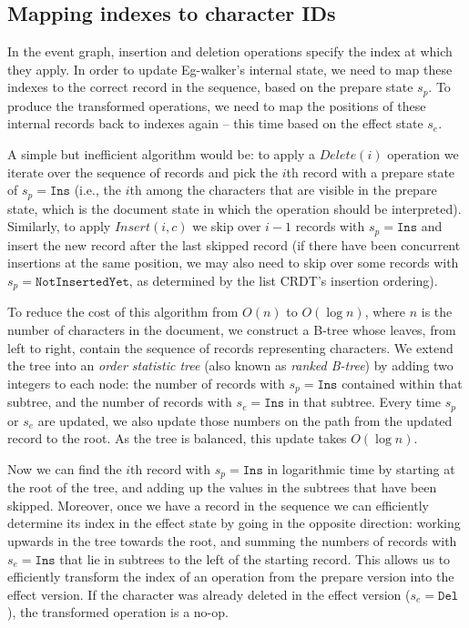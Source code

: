 \documentclass[sigplan,10pt]{acmart}
\newcommand{\algname}{Eg-walker\xspace}
\begin{document}
\subsection{Mapping indexes to character IDs}

In the event graph, insertion and deletion operations specify the index at which they apply.
In order to update \algname's internal state, we need to map these indexes to the correct record in the sequence, based on the prepare state $s_p$.
To produce the transformed operations, we need to map the positions of these internal records back to indexes again -- this time based on the effect state $s_e$.

A simple but inefficient algorithm would be: to apply a $\mathit{Delete}(i)$ operation we iterate over the sequence of records and pick the $i$th record with a prepare state of $s_p = \texttt{Ins}$ (i.e., the $i$th among the characters that are visible in the prepare state, which is the document state in which the operation should be interpreted).
Similarly, to apply $\mathit{Insert}(i, c)$ we skip over $i - 1$ records with $s_p = \texttt{Ins}$ and insert the new record after the last skipped record (if there have been concurrent insertions at the same position, we may also need to skip over some records with $s_p = \texttt{NotInsertedYet}$, as determined by the list CRDT's insertion ordering).

To reduce the cost of this algorithm from $O(n)$ to $O(\log n)$, where $n$ is the number of characters in the document, we construct a B-tree whose leaves, from left to right, contain the sequence of records representing characters.
We extend the tree into an \emph{order statistic tree} \cite{CLRS2009} (also known as \emph{ranked B-tree}) by adding two integers to each node: the number of records with $s_p = \texttt{Ins}$ contained within that subtree, and the number of records with $s_e = \texttt{Ins}$ in that subtree.
Every time $s_p$ or $s_e$ are updated, we also update those numbers on the path from the updated record to the root.
As the tree is balanced, this update takes $O(\log n)$.

Now we can find the $i$th record with $s_p = \texttt{Ins}$ in logarithmic time by starting at the root of the tree, and adding up the values in the subtrees that have been skipped.
Moreover, once we have a record in the sequence we can efficiently determine its index in the effect state by going in the opposite direction: working upwards in the tree towards the root, and summing the numbers of records with $s_e = \texttt{Ins}$ that lie in subtrees to the left of the starting record.
This allows us to efficiently transform the index of an operation from the prepare version into the effect version.
If the character was already deleted in the effect version ($s_e = \texttt{Del}$), the transformed operation is a no-op.
\end{document}
